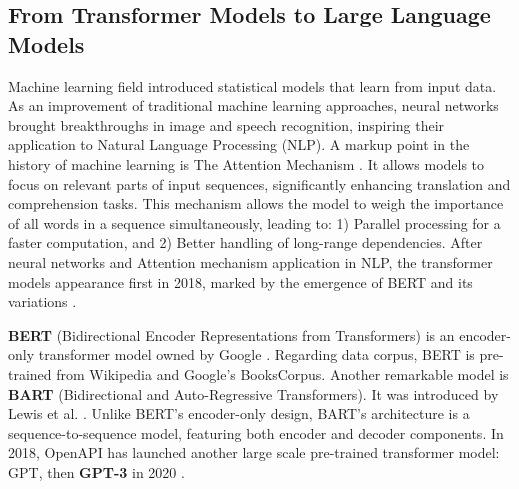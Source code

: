 \subsection{From Transformer Models to Large Language Models}

Machine learning field introduced statistical models that learn from input data. As an improvement of traditional machine learning approaches, neural networks brought breakthroughs in image and speech recognition, inspiring their application to Natural Language Processing (NLP). A markup point in the history of machine learning is The Attention Mechanism \cite{10.5555/3295222.3295349}. It allows models to focus on relevant parts of input sequences, significantly enhancing translation and comprehension tasks.
This mechanism allows the model to weigh the importance of all words in a sequence simultaneously, leading to: 1) Parallel processing for a faster computation, and 2) Better handling of long-range dependencies. After neural networks and Attention mechanism application in NLP, the transformer models appearance first in 2018, marked by the emergence of BERT and its variations \cite{DBLP:journals/corr/abs-2302-09419}.


\textbf{BERT} (Bidirectional Encoder Representations from Transformers) is an encoder-only transformer model owned by Google \cite{devlin2019bertpretrainingdeepbidirectional}. Regarding data corpus, BERT is pre-trained from  Wikipedia and Google’s BooksCorpus. Another remarkable model is \textbf{BART} (Bidirectional and Auto-Regressive Transformers). It was introduced by Lewis et al. \cite{lewis2019bartdenoisingsequencetosequencepretraining}.
Unlike BERT’s encoder-only design, BART’s architecture is a sequence-to-sequence model, featuring both encoder and decoder components.
In 2018, OpenAPI has launched another large scale pre-trained transformer model: GPT, then \textbf{GPT-3} in 2020 \cite{10113601}.


 


